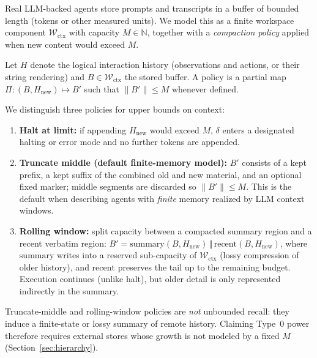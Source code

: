 Real LLM-backed agents store prompts and transcripts in a buffer of bounded length (tokens or other measured units). We model this as a finite workspace component $\mathcal{W}_{\mathrm{ctx}}$ with capacity $M \in \mathbb{N}$, together with a \emph{compaction policy} applied when new content would exceed $M$.

Let $H$ denote the logical interaction history (observations and actions, or their string rendering) and $B \in \mathcal{W}_{\mathrm{ctx}}$ the stored buffer. A policy is a partial map $\Pi : (B,H_{\mathrm{new}}) \mapsto B'$ such that $\lVert B' \rVert \le M$ whenever defined.

\begin{definition}
\label{def:ctx-policies}
We distinguish three policies for upper bounds on context:
\begin{enumerate}
  \item \textbf{Halt at limit:} if appending $H_{\mathrm{new}}$ would exceed $M$, $\delta$ enters a designated halting or error mode and no further tokens are appended.
  \item \textbf{Truncate middle (default finite-memory model):} $B'$ consists of a kept prefix, a kept suffix of the combined old and new material, and an optional fixed marker; middle segments are discarded so $\lVert B' \rVert \le M$. This is the default when describing agents with \emph{finite} memory realized by LLM context windows.
  \item \textbf{Rolling window:} split capacity between a compacted summary region and a recent verbatim region: $B' = \mathrm{summary}(B,H_{\mathrm{new}}) \,\Vert\, \mathrm{recent}(B,H_{\mathrm{new}})$, where $\mathrm{summary}$ writes into a reserved sub-capacity of $\mathcal{W}_{\mathrm{ctx}}$ (lossy compression of older history), and $\mathrm{recent}$ preserves the tail up to the remaining budget. Execution continues (unlike halt), but older detail is only represented indirectly in the summary.
\end{enumerate}
\end{definition}

\begin{remark}
Truncate-middle and rolling-window policies are \emph{not} unbounded recall: they induce a finite-state or lossy summary of remote history. Claiming Type~0 power therefore requires external stores whose growth is not modeled by a fixed $M$ (Section~\ref{sec:hierarchy}).
\end{remark}
